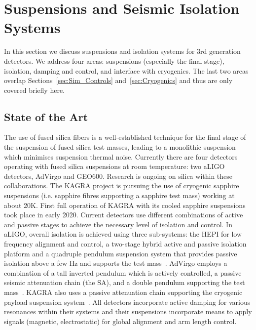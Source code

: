 \chapter{Suspensions and Seismic Isolation Systems}
\label{sec:Suspensions_Isolation}

\begin{samepage} %

In this section we discuss suspensions and isolation systems for 3rd generation detectors. We address four areas: suspensions (especially the final stage), isolation, damping and control, and interface with cryogenics. The last two areas overlap Sections~\ref{sec:Sim_Controls} and~\ref{sec:Cryogenics} and thus are only covered briefly here.

\section{State of the Art}
The use of fused silica fibers is a well-established technique for the final stage of the suspension of fused silica test masses, leading to a monolithic suspension which minimises suspension thermal noise. Currently there are four detectors operating with fused silica suspensions at room temperature: two \ac{aLIGO} detectors, \ac{AdVirgo} and \ac{GEO600}. Research is ongoing on silica within these collaborations.
The \ac{KAGRA} project is pursuing the use of cryogenic sapphire suspensions (i.e. sapphire fibres supporting a sapphire test mass) working at about 20K. First full operation of \ac{KAGRA} with its cooled sapphire suspensions took place in early 2020.
Current detectors use different combinations of active and passive stages to achieve the necessary level of isolation and control. In \ac{aLIGO}, overall isolation is achieved using three sub-systems: the \ac{HEPI} for low frequency alignment and control, a two-stage hybrid active and passive isolation platform and a quadruple pendulum suspension system that provides passive isolation above a few Hz and supports the test mass~\cite{Matichard_2015}. \ac{AdVirgo} employs a combination of a tall inverted pendulum which is actively controlled, a passive seismic attenuation chain (the \ac{SA}), and a double pendulum supporting the test mass~\cite{AdvancedVirgo2015}. \ac{KAGRA} also uses a passive attenuation chain supporting the cryogenic payload suspension system~\cite{KAGRA2013}. All detectors incorporate active damping for various resonances within their systems and their suspensions incorporate means to apply signals (magnetic, electrostatic) for global alignment and arm length control.


\end{samepage}
